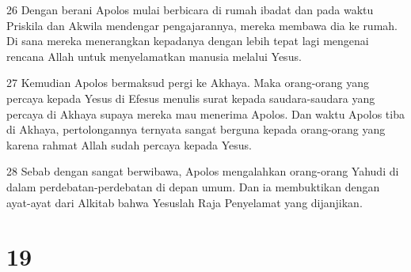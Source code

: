 \par 26 Dengan berani Apolos mulai berbicara di rumah ibadat dan pada waktu Priskila dan Akwila mendengar pengajarannya, mereka membawa dia ke rumah. Di sana mereka menerangkan kepadanya dengan lebih tepat lagi mengenai rencana Allah untuk menyelamatkan manusia melalui Yesus.
\par 27 Kemudian Apolos bermaksud pergi ke Akhaya. Maka orang-orang yang percaya kepada Yesus di Efesus menulis surat kepada saudara-saudara yang percaya di Akhaya supaya mereka mau menerima Apolos. Dan waktu Apolos tiba di Akhaya, pertolongannya ternyata sangat berguna kepada orang-orang yang karena rahmat Allah sudah percaya kepada Yesus.
\par 28 Sebab dengan sangat berwibawa, Apolos mengalahkan orang-orang Yahudi di dalam perdebatan-perdebatan di depan umum. Dan ia membuktikan dengan ayat-ayat dari Alkitab bahwa Yesuslah Raja Penyelamat yang dijanjikan.

\chapter{19}

